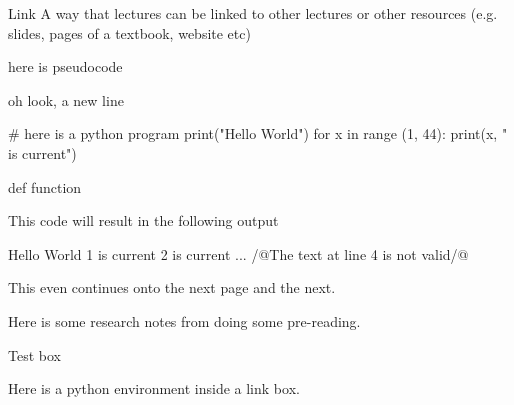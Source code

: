 \documentclass[a4paper, 11pt]{report}
\begin{document}
    

    \begin{link}{Link}
        A way that lectures can be linked to other lectures or other resources (e.g. slides, pages of a textbook, website etc)
    \end{link}
\begin{pseudo}
here is pseudocode

oh look, a new line
\end{pseudo}

\begin{python}
# here is a python program
print("Hello World")
for x in range (1, 44):
    print(x, " is current")

def function
\end{python}
This code will result in the following output
\begin{pseudo*}
Hello World
1 is current
2 is current
...
/@The text at line 4 is not valid/@
\end{pseudo*}

    \newpage
    This even continues onto the next page
    \newpage
    and the next.




    Here is some research notes from doing some pre-reading.


    \begin{link}{Test box}
        \begin{python}
            Here is a python environment inside a link box.
        \end{python}
    \end{link}
\end{document}
